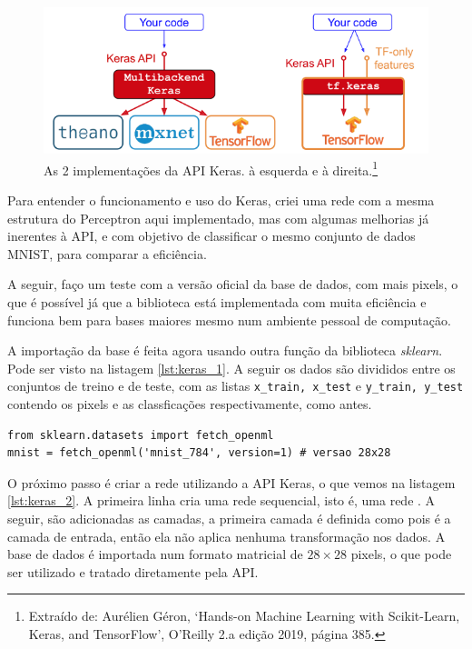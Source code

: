 \begin{figure}[htb]
\centering
\includegraphics[width=12cm]{figuras/tensor_flow}
\caption{As 2 implementações da API Keras.  à esquerda e  à direita.\footnote{Extraído de: Aurélien Géron, `Hands-on Machine Learning with Scikit-Learn, Keras, and TensorFlow', O'Reilly 2.a edição 2019, página 385.}}
\label{fig:tensor_flow}
\end{figure}

Para entender o funcionamento e uso do Keras, criei uma rede com a mesma estrutura do Perceptron aqui implementado, mas com algumas melhorias já inerentes à API, e com objetivo de classificar o mesmo conjunto de dados MNIST, para comparar a eficiência.

A seguir, faço um teste com a versão oficial da base de dados, com mais pixels, o que é possível já que a biblioteca está implementada com muita eficiência e funciona bem para bases maiores mesmo num ambiente pessoal de computação.

A importação da base é feita agora usando outra função da biblioteca \emph{sklearn}. Pode ser visto na listagem \ref{lst:keras_1}. A seguir os dados são divididos entre os conjuntos de treino e de teste, com as listas \texttt{x\_train, x\_test} e \texttt{y\_train, y\_test} contendo os pixels e as classficações respectivamente, como antes.

\begin{scriptsize}
\estiloR
\begin{lstlisting}[caption={Trecho do script \eng{mnist\_keras.py}}, label={lst:keras_1}, escapeinside={\%}]
from sklearn.datasets import fetch_openml
mnist = fetch_openml('mnist_784', version=1) # versao 28x28
\end{lstlisting}
\end{scriptsize}

O próximo passo é criar a rede utilizando a API Keras, o que vemos na listagem \ref{lst:keras_2}. A primeira linha cria uma rede sequencial, isto é, uma rede . A seguir, são adicionadas as camadas, a primeira camada é definida como  pois é a camada de entrada, então ela não aplica nenhuma transformação nos dados. A base de dados é importada num formato matricial de $28\times28$ pixels, o que pode ser utilizado e tratado diretamente pela API.

